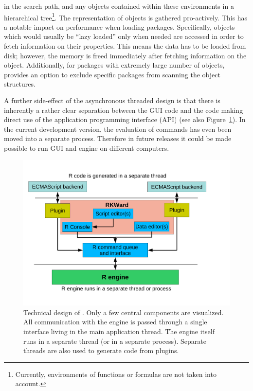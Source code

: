 in the search path, and any objects contained within these environments in a
hierarchical tree\footnote{
    Currently, environments of functions or formulas are not taken into account.
}. The representation of  objects is gathered
pro-actively. This has a notable impact on performance when loading packages.
Specifically, objects which would usually be ``lazy loaded'' only when needed \citep[see][]{Ripley2004} are
accessed in order to fetch information on their properties. This means the data
has to be loaded from disk; however, the memory is freed immediately after fetching
information on the object. Additionally, for packages with extremely large number of objects, 
provides an option to exclude specific packages from scanning the object structures.

A further side-effect of the asynchronous threaded design is that there is
inherently a rather clear separation between the GUI code and the code making direct use
of the  application programming interface (API) (see also Figure~\ref{fig:design_sketch}). 
In the current development version, the evaluation
of  commands has even been moved into a separate process. Therefore in future releases it could 
be made possible to run GUI and  engine on different computers.

\begin{figure}[t!]
 \centering
 \includegraphics[clip=true,trim=0cm 2cm 0cm 0cm]{../figures/design_sketch.pdf}
 \caption{Technical design of . Only a few central components are visualized.
 All communication with the  engine is passed through a single interface living in the main application thread. The  engine itself
 runs in a separate thread (or in a separate process). 
 Separate threads are also used to generate  code from plugins.
}
 \label{fig:design_sketch}
\end{figure}

